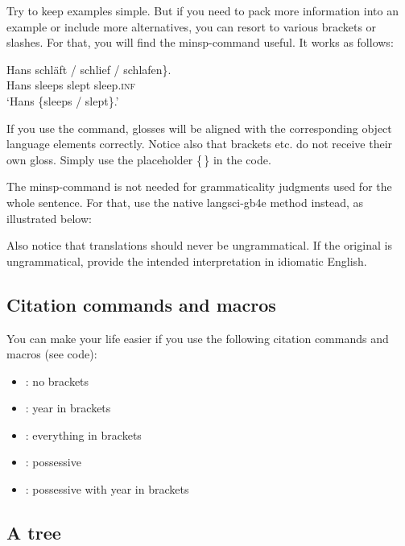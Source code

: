 Try to keep examples simple. But if you need to pack more information into an example or include more alternatives, you can resort to various brackets or slashes. For that, you will find the minsp-command useful. It works as follows:

\ea \gll Hans \minsp{\{} schläft / schlief / \minsp{*} schlafen\}.\\
Hans {} sleeps {} slept {} {} sleep.\textsc{inf}\\
\glt `Hans \{sleeps / slept\}.'
\z

\noindent If you use the command, glosses will be aligned with the corresponding object language elements correctly. Notice also that brackets etc. do not receive their own gloss. Simply use the placeholder \{\,\} in the code.

The minsp-command is not needed for grammaticality judgments used for the whole sentence. For that, use the native langsci-gb4e method instead, as illustrated below:

\z

\noindent Also notice that translations should never be ungrammatical. If the original is ungrammatical, provide the intended interpretation in idiomatic English.

\subsection{Citation commands and macros}

You can make your life easier if you use the following citation commands and macros (see code):

\begin{itemize}
    \item \citealt{Bailyn2004}: no brackets
    \item \citet{Bailyn2004}: year in brackets
    \item \citep{Bailyn2004}: everything in brackets
    \item {}: possessive
    \item {}: possessive with year in brackets
\end{itemize}

\subsection{A tree}\label{s:tree}

